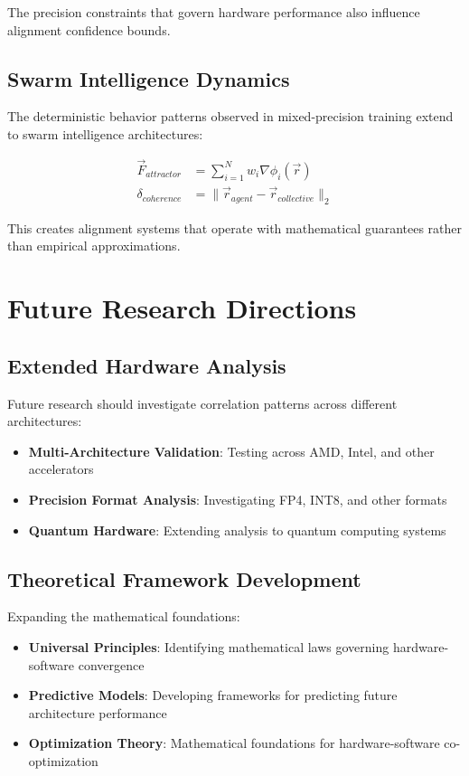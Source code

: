 \documentclass[conference]{IEEEtran}
\begin{document}
The precision constraints that govern hardware performance also influence alignment confidence bounds.

\subsection{Swarm Intelligence Dynamics}

The deterministic behavior patterns observed in mixed-precision training extend to swarm intelligence architectures:

\begin{align}
\vec{F}_{attractor} &= \sum_{i=1}^{N} w_i \nabla \phi_i(\vec{r}) \\
\delta_{coherence} &= \|\vec{r}_{agent} - \vec{r}_{collective}\|_2
\end{align}

This creates alignment systems that operate with mathematical guarantees rather than empirical approximations.

\section{Future Research Directions}

\subsection{Extended Hardware Analysis}

Future research should investigate correlation patterns across different architectures:

\begin{itemize}
\item \textbf{Multi-Architecture Validation}: Testing across AMD, Intel, and other accelerators
\item \textbf{Precision Format Analysis}: Investigating FP4, INT8, and other formats
\item \textbf{Quantum Hardware}: Extending analysis to quantum computing systems
\end{itemize}

\subsection{Theoretical Framework Development}

Expanding the mathematical foundations:

\begin{itemize}
\item \textbf{Universal Principles}: Identifying mathematical laws governing hardware-software convergence
\item \textbf{Predictive Models}: Developing frameworks for predicting future architecture performance
\item \textbf{Optimization Theory}: Mathematical foundations for hardware-software co-optimization
\end{itemize}
\end{document}
